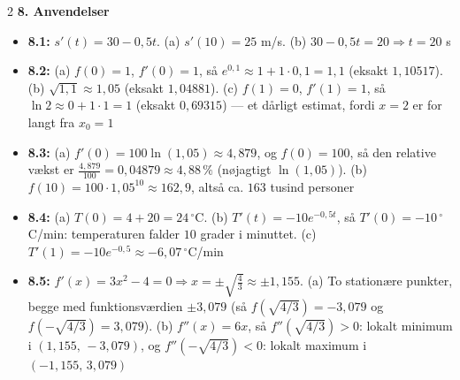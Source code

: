 \documentclass[11pt,a4paper]{article}
\begin{document}
\begin{multicols}{2}
\noindent\textbf{8. Anvendelser}
\begin{itemize}[leftmargin=1.3em, itemsep=1pt, topsep=2pt]
  \item \textbf{8.1:} $s'(t) = 30 - 0{,}5t$. (a) $s'(10) = 25$ m/s.
        (b) $30 - 0{,}5t = 20 \Rightarrow t = 20$ s
  \item \textbf{8.2:} (a) $f(0) = 1$, $f'(0) = 1$, så
        $e^{0{,}1} \approx 1 + 1\cdot 0{,}1 = 1{,}1$
        (eksakt $1{,}10517$). (b) $\sqrt{1{,}1} \approx 1{,}05$
        (eksakt $1{,}04881$). (c) $f(1) = 0$, $f'(1) = 1$, så
        $\ln 2 \approx 0 + 1\cdot 1 = 1$ (eksakt $0{,}69315$) ---
        et dårligt estimat, fordi $x = 2$ er for langt fra $x_{0} = 1$
  \item \textbf{8.3:} (a) $f'(0) = 100\ln(1{,}05) \approx 4{,}879$, og
        $f(0) = 100$, så den relative vækst er
        $\frac{4{,}879}{100} = 0{,}04879 \approx 4{,}88\,\%$
        (nøjagtigt $\ln(1{,}05)$). (b) $f(10) = 100 \cdot 1{,}05^{10}
        \approx 162{,}9$, altså ca. $163$ tusind personer
  \item \textbf{8.4:} (a) $T(0) = 4 + 20 = 24\,^{\circ}$C.
        (b) $T'(t) = -10e^{-0{,}5t}$, så $T'(0) = -10\,^{\circ}$C/min:
        temperaturen falder $10$ grader i minuttet.
        (c) $T'(1) = -10e^{-0{,}5} \approx -6{,}07\,^{\circ}$C/min
  \item \textbf{8.5:} $f'(x) = 3x^{2} - 4 = 0 \Rightarrow x = \pm\sqrt{\tfrac{4}{3}}
        \approx \pm 1{,}155$. (a) To stationære punkter, begge med
        funktionsværdien $\pm 3{,}079$ (så $f(\sqrt{4/3}) = -3{,}079$ og
        $f(-\sqrt{4/3}) = 3{,}079$). (b) $f''(x) = 6x$, så
        $f''(\sqrt{4/3}) > 0$: lokalt minimum i $(1{,}155,\,-3{,}079)$, og
        $f''(-\sqrt{4/3}) < 0$: lokalt maximum i $(-1{,}155,\,3{,}079)$
\end{itemize}

\end{multicols}
\end{document}
